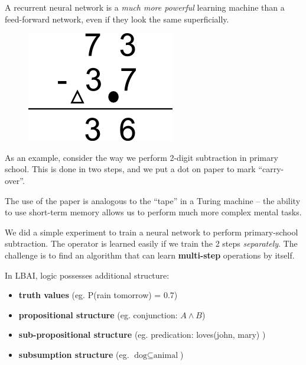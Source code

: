 \documentclass{llncs}
\begin{document}
\begin{tcolorbox}[width=\textwidth,colback={white},title={\centering \textbf{Example: } primary-school arithmetic},colbacktitle=white,coltitle=black]

A recurrent neural network is a \textit{much more powerful} learning machine than a feed-forward network, even if they look the same superficially.

\begin{figure}
\includegraphics[scale=0.6]{elementary-arithmetic.png}
\end{figure} 

As an example, consider the way we perform 2-digit subtraction in primary school.  This is done in two steps, and we put a dot on paper to mark ``carry-over''.

The use of the paper is analogous to the ``tape'' in a Turing machine -- the ability to use short-term memory allows us to perform much more complex mental tasks.

We did a simple experiment to train a neural network to perform primary-school subtraction.  The operator is learned easily if we train the 2 steps \textit{separately}.  The challenge is to find an algorithm that can learn \textbf{multi-step} operations by itself.

\end{tcolorbox}  

In LBAI, logic possesses additional structure:
\begin{itemize}
\item \textbf{truth values} (eg. P(rain tomorrow) = 0.7)
\item \textbf{propositional structure} (eg. conjunction: $A \wedge B$) 
\item \textbf{sub-propositional structure} (eg. predication: loves(john, mary) )
\item \textbf{subsumption structure} (eg. $\mbox{dog} \subseteq \mbox{animal}$)
\end{itemize}
\end{document}
